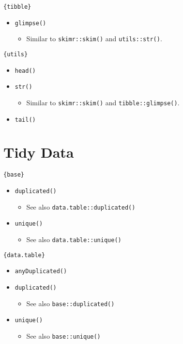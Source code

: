 \documentclass[
]{book}
\providecommand{\tightlist}{%
  \setlength{\itemsep}{0pt}\setlength{\parskip}{0pt}}
\begin{document}
\texttt{\{tibble\}}

\begin{itemize}
\tightlist
\item
  \texttt{glimpse()}

  \begin{itemize}
  \tightlist
  \item
    Similar to \texttt{skimr::skim()} and \texttt{utils::str()}.
  \end{itemize}
\end{itemize}

\texttt{\{utils\}}

\begin{itemize}
\tightlist
\item
  \texttt{head()}
\item
  \texttt{str()}

  \begin{itemize}
  \tightlist
  \item
    Similar to \texttt{skimr::skim()} and \texttt{tibble::glimpse()}.
  \end{itemize}
\item
  \texttt{tail()}
\end{itemize}

\hypertarget{tidy-data}{%
\section{Tidy Data}\label{tidy-data}}

\texttt{\{base\}}

\begin{itemize}
\tightlist
\item
  \texttt{duplicated()}

  \begin{itemize}
  \tightlist
  \item
    See also \texttt{data.table::duplicated()}
  \end{itemize}
\item
  \texttt{unique()}

  \begin{itemize}
  \tightlist
  \item
    See also \texttt{data.table::unique()}
  \end{itemize}
\end{itemize}

\texttt{\{data.table\}}

\begin{itemize}
\tightlist
\item
  \texttt{anyDuplicated()}
\item
  \texttt{duplicated()}

  \begin{itemize}
  \tightlist
  \item
    See also \texttt{base::duplicated()}
  \end{itemize}
\item
  \texttt{unique()}

  \begin{itemize}
  \tightlist
  \item
    See also \texttt{base::unique()}
  \end{itemize}
\end{itemize}
\end{document}

